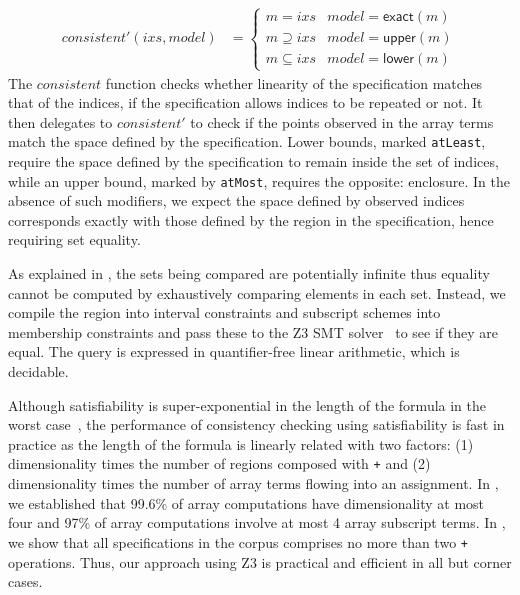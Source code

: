 \begin{align*}
  \mathit{consistent'}(\mathit{ixs}, \mathit{model}) & = \begin{cases}
    m = \mathit{ixs} & \mathit{model} = \mathsf{exact}(m) \\
    m \supseteq \mathit{ixs} & \mathit{model} = \mathsf{upper}(m) \\
    m \subseteq \mathit{ixs} & \mathit{model} = \mathsf{lower}(m)
  \end{cases}
\end{align*}
%
The $\mathit{consistent}$ function checks whether linearity of the
specification matches that of the indices, \ie{} if the specification allows
indices to be repeated or not. It then delegates to $\mathit{consistent'}$
to check if the points observed in the array terms match the space
defined by the specification. Lower bounds, marked \texttt{atLeast},
require the space defined by the specification to remain inside the
set of indices, while an upper bound, marked by \texttt{atMost},
requires the opposite: enclosure. In the absence of such modifiers, we expect
the space defined by observed indices corresponds exactly with those defined by the
region in the specification, hence requiring set equality.

As explained in , the sets being compared are
potentially infinite thus equality cannot be computed by exhaustively
comparing elements in each set. Instead, we compile the region into
interval constraints and subscript schemes into membership constraints and pass
these to the \textsc{Z3} SMT solver~\citep{de2008z3} to see if they are equal. The
query is expressed in quantifier-free linear arithmetic, which is decidable.

Although satisfiability is super-exponential in the length of the formula in
the worst case~\cite{fischer1974super}, the performance of consistency checking
using satisfiability is fast in practice as the length of the formula is linearly
related with two factors: (1) dimensionality times the number of regions composed
with \texttt{+} and (2) dimensionality times the number of array terms flowing
into an assignment. In , we
established that 99.6\% of array computations have
dimensionality at most four and 97\% of array computations
involve at most 4 array subscript terms. In
, we show that all specifications in the corpus
comprises no more than two \texttt{+} operations. Thus, our approach
using Z3 is practical and efficient in all but corner cases.


